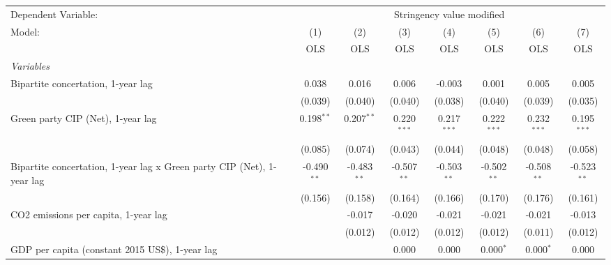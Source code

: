 
\begingroup
\centering
\begin{tabular}{lccccccc}
   \toprule
   Dependent Variable: & \multicolumn{7}{c}{Stringency value modified}\\
   Model:                                                                 & (1)           & (2)           & (3)           & (4)           & (5)           & (6)           & (7)\\  
                                                                          &  OLS          & OLS           & OLS           & OLS           & OLS           & OLS           & OLS\\  
   \midrule
   \emph{Variables}\\
   Bipartite concertation, 1-year lag                                     & 0.038         & 0.016         & 0.006         & -0.003        & 0.001         & 0.005         & 0.005\\   
                                                                          & (0.039)       & (0.040)       & (0.040)       & (0.038)       & (0.040)       & (0.039)       & (0.035)\\   
   Green party CIP (Net), 1-year lag                                      & 0.198$^{**}$  & 0.207$^{**}$  & 0.220$^{***}$ & 0.217$^{***}$ & 0.222$^{***}$ & 0.232$^{***}$ & 0.195$^{***}$\\   
                                                                          & (0.085)       & (0.074)       & (0.043)       & (0.044)       & (0.048)       & (0.048)       & (0.058)\\   
   Bipartite concertation, 1-year lag x Green party CIP (Net), 1-year lag & -0.490$^{**}$ & -0.483$^{**}$ & -0.507$^{**}$ & -0.503$^{**}$ & -0.502$^{**}$ & -0.508$^{**}$ & -0.523$^{**}$\\   
                                                                          & (0.156)       & (0.158)       & (0.164)       & (0.166)       & (0.170)       & (0.176)       & (0.161)\\   
   CO2 emissions per capita, 1-year lag                                   &               & -0.017        & -0.020        & -0.021        & -0.021        & -0.021        & -0.013\\   
                                                                          &               & (0.012)       & (0.012)       & (0.012)       & (0.012)       & (0.011)       & (0.012)\\   
   GDP per capita (constant 2015 US\$), 1-year lag                        &               &               & 0.000         & 0.000         & 0.000$^{*}$   & 0.000$^{*}$   & 0.000\\   

\end{tabular}
